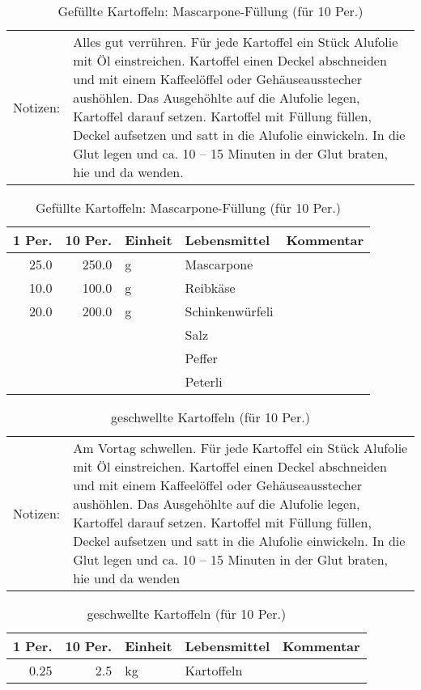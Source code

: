 \documentclass[11pt,a4paper]{article}%
\begin{document}
\begin{table}[h]%
\caption{Gefüllte Kartoffeln: Mascarpone{-}Füllung (für 10 Per.)}%
\begin{tabularx}{\textwidth}{l X}%
Notizen:&Alles gut verrühren.\newline%
\newline%
Für jede Kartoffel ein Stück Alufolie mit Öl einstreichen. Kartoffel einen Deckel abschneiden und mit einem Kaffeelöffel oder Gehäuseausstecher aushöhlen. Das Ausgehöhlte auf die Alufolie legen, Kartoffel darauf setzen. Kartoffel mit Füllung füllen, Deckel aufsetzen und satt in die Alufolie einwickeln. In die Glut legen und ca. 10 – 15 Minuten in der Glut braten, hie und da wenden.\\%
\end{tabularx}%
\par%
\begin{tabularx}{\textwidth}{| r | r | l | l | X |}%
\hline%
\tiny{1 Per.}&\tiny{10 Per.}&\tiny{Einheit}&\tiny{Lebensmittel}&\tiny{Kommentar}\\%
\hline%
25.0&250.0&g&Mascarpone&\\%
\hline%
10.0&100.0&g&Reibkäse&\\%
\hline%
20.0&200.0&g&Schinkenwürfeli&\\%
\hline%
&&&Salz&\\%
\hline%
&&&Peffer&\\%
\hline%
&&&Peterli&\\%
\hline%
\end{tabularx}%
\end{table}

%
\vspace{0.75cm}%
\renewcommand{\arraystretch}{1.25}%


\begin{table}[h]%
\caption{geschwellte Kartoffeln (für 10 Per.)}%
\begin{tabularx}{\textwidth}{l X}%
Notizen:&Am Vortag schwellen.\newline%
\newline%
Für jede Kartoffel ein Stück Alufolie mit Öl einstreichen. Kartoffel einen Deckel abschneiden und mit einem Kaffeelöffel oder Gehäuseausstecher aushöhlen. Das Ausgehöhlte auf die Alufolie legen, Kartoffel darauf setzen. Kartoffel mit Füllung füllen, Deckel aufsetzen und satt in die Alufolie einwickeln. In die Glut legen und ca. 10 – 15 Minuten in der Glut braten, hie und da wenden \\%
\end{tabularx}%
\par%
\begin{tabularx}{\textwidth}{| r | r | l | l | X |}%
\hline%
\tiny{1 Per.}&\tiny{10 Per.}&\tiny{Einheit}&\tiny{Lebensmittel}&\tiny{Kommentar}\\%
\hline%
0.25&2.5&kg&Kartoffeln&\\%
\hline%
\end{tabularx}%
\end{table}
\end{document}
